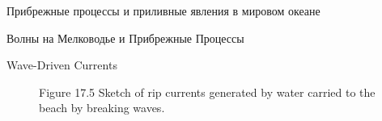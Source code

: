 \begin{chapter}{Прибрежные процессы и приливные явления в мировом океане}
\begin{section}{Волны на Мелководье и Прибрежные Процессы}
\begin{paragraph}{Wave-Driven Currents}
\begin{figure}[b!]
\caption{Figure 17.5 Sketch of rip currents
generated by water carried to the beach by breaking waves.}
\label{fig:rips}
\end{figure}
%
%


\end{paragraph}
\end{section}
\end{chapter}
